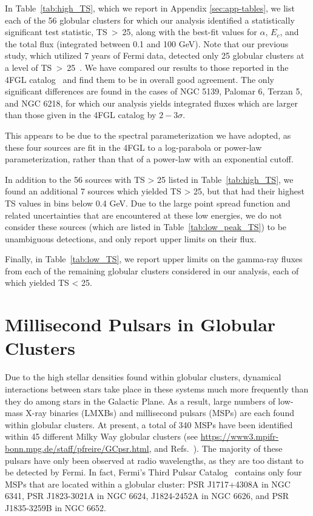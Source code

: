 \documentclass[a4paper,11pt]{article}
\begin{document}
In Table~\ref{tab:high_TS}, which we report in Appendix \ref{sec:app-tables}, we list each of the 56 globular clusters for which our analysis identified a statistically significant test statistic, \mbox{TS > 25}, along with the best-fit values for $\alpha$, $E_c$, and the total flux (integrated between 0.1 and 100 GeV). Note that our previous study, which utilized 7 years of Fermi data, detected only 25 globular clusters at a level of \mbox{TS > 25}~\cite{Hooper:2016rap}. We have compared our results to those reported in the 4FGL catalog~\cite{Ballet:2023qzs} and find them to be in overall good agreement. The only significant differences are found in the cases of NGC 5139, Palomar 6, Terzan 5, and NGC 6218, for which our analysis yields integrated fluxes which are larger than those given in the 4FGL catalog by $2-3\sigma$. 

\noindent
This appears to be due to the spectral parameterization we have adopted, as these four sources are fit in the 4FGL to a log-parabola or power-law parameterization, rather than that of a power-law with an exponential cutoff.

In addition to the 56 sources with TS > 25 listed in Table~\ref{tab:high_TS}, we found an additional 7 sources which yielded TS > 25, but that had their highest TS values in bins below 0.4 GeV. Due to the large point spread function and related uncertainties that are encountered at these low energies, we do not consider these sources (which are listed in Table~\ref{tab:low_peak_TS}) to be unambiguous detections, and only report upper limits on their flux.

Finally, in Table~\ref{tab:low_TS}, we report upper limits on the gamma-ray fluxes from each of the remaining globular clusters considered in our analysis, each of which yielded TS < 25. 

\section{Millisecond Pulsars in Globular Clusters}
\label{sec:cases}

Due to the high stellar densities found within globular clusters, dynamical interactions between stars take place in these systems much more frequently than they do among stars in the Galactic Plane. As a result, large numbers of low-mass X-ray binaries (LMXBs) and millisecond pulsars (MSPs) are each found within globular clusters. At present, a total of 340 MSPs have been identified within 45 different Milky Way globular clusters (see \url{https://www3.mpifr-bonn.mpg.de/staff/pfreire/GCpsr.html}, and Refs.~\cite{Manchester:2004bp,Fermi-LAT:2023zzt}). The majority of these pulsars have only been observed at radio wavelengths, as they are too distant to be detected by Fermi. In fact, Fermi's Third Pulsar Catalog~\cite{Fermi-LAT:2023zzt} contains only four MSPs that are located within a globular cluster: 
%
PSR J1717+4308A in NGC 6341, PSR J1823-3021A in NGC 6624, J1824-2452A in NGC 6626, and PSR J1835-3259B in NGC 6652. 
\end{document}
